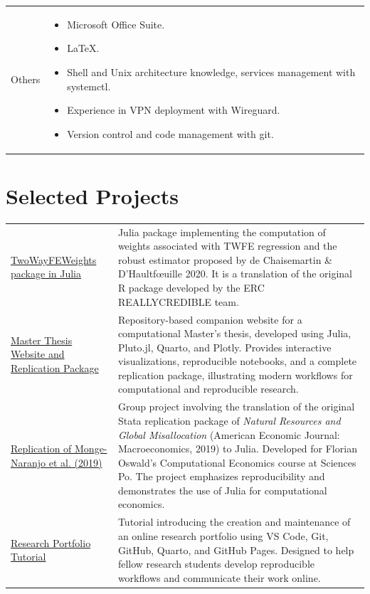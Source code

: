 \documentclass[a4paper,12pt]{article}
\begin{document}
\begin{tabularx}{\linewidth}{@{}l X@{}}
    Others \quad \quad \quad \quad \quad \quad &
    \begin{itemize}
        \item Microsoft Office Suite.
        \item \LaTeX.
        \item Shell and Unix architecture knowledge, services management with systemctl.
        \item Experience in VPN deployment with Wireguard.
        \item Version control and code management with git.
    \end{itemize}
\end{tabularx}

\section{Selected Projects}

\begin{tabularx}{\linewidth}{@{}l X@{}}

\href{https://www.paulogcd.com/twowayfeweights.jl/dev/}{TwoWayFEWeights package in Julia} &
Julia package implementing the computation of weights associated with TWFE regression and the robust estimator proposed by de Chaisemartin \& D'Haultfœuille 2020.
It is a translation of the original R package developed by the ERC REALLYCREDIBLE team. \\

\href{https://www.paulogcd.com/Master_Thesis}{Master Thesis Website and Replication Package} &
Repository-based companion website for a computational Master's thesis, developed using Julia, Pluto.jl, Quarto, and Plotly.
Provides interactive visualizations, reproducible notebooks, and a complete replication package, illustrating modern workflows for computational and reproducible research. \\

\href{https://www.paulogcd.com/Replication_Monge_et_al_2019.jl/dev/}{Replication of Monge-Naranjo et al. (2019)} &
Group project involving the translation of the original Stata replication package of \textit{Natural Resources and Global Misallocation} (American Economic Journal: Macroeconomics, 2019) to Julia. Developed for Florian Oswald's Computational Economics course at Sciences Po. The project emphasizes reproducibility and demonstrates the use of Julia for computational economics. \\

\href{https://www.paulogcd.com/portfolio_tutorial/}{Research Portfolio Tutorial} &
Tutorial introducing the creation and maintenance of an online research portfolio using VS Code, Git, GitHub, Quarto, and GitHub Pages. Designed to help fellow research students develop reproducible workflows and communicate their work online. \\

\end{tabularx}
\end{document}
